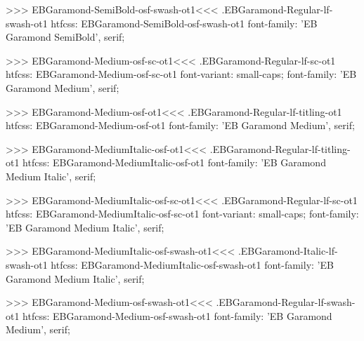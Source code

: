 {{{{{{{>>>
\<EBGaramond-SemiBold-osf-swash-ot1\><<<
.EBGaramond-Regular-lf-swash-ot1
htfcss:  EBGaramond-SemiBold-osf-swash-ot1  font-family: 'EB Garamond SemiBold', serif;

>>>
\<EBGaramond-Medium-osf-sc-ot1\><<<
.EBGaramond-Regular-lf-sc-ot1
htfcss:  EBGaramond-Medium-osf-sc-ot1  font-variant: small-caps; font-family: 'EB Garamond Medium', serif;

>>>
\<EBGaramond-Medium-osf-ot1\><<<
.EBGaramond-Regular-lf-titling-ot1
htfcss:  EBGaramond-Medium-osf-ot1  font-family: 'EB Garamond Medium', serif;

>>>
\<EBGaramond-MediumItalic-osf-ot1\><<<
.EBGaramond-Regular-lf-titling-ot1
htfcss:  EBGaramond-MediumItalic-osf-ot1  font-family: 'EB Garamond Medium Italic', serif;

>>>
\<EBGaramond-MediumItalic-osf-sc-ot1\><<<
.EBGaramond-Regular-lf-sc-ot1
htfcss:  EBGaramond-MediumItalic-osf-sc-ot1  font-variant: small-caps; font-family: 'EB Garamond Medium Italic', serif;

>>>
\<EBGaramond-MediumItalic-osf-swash-ot1\><<<
.EBGaramond-Italic-lf-swash-ot1
htfcss:  EBGaramond-MediumItalic-osf-swash-ot1  font-family: 'EB Garamond Medium Italic', serif;

>>>
\<EBGaramond-Medium-osf-swash-ot1\><<<
.EBGaramond-Regular-lf-swash-ot1
htfcss:  EBGaramond-Medium-osf-swash-ot1  font-family: 'EB Garamond Medium', serif;

}}}}}}}
